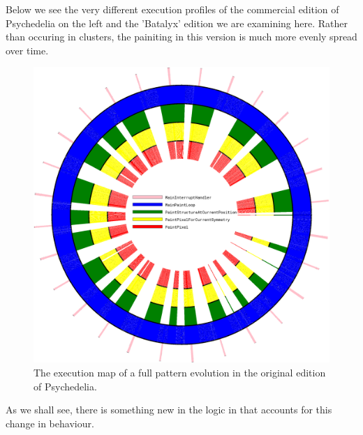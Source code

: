 \clearpage
Below we see the very different execution profiles of the commercial edition of Psychedelia on the left and 
the 'Batalyx' edition we are examining here. Rather than occuring in clusters, the painiting in this version
is much more evenly spread over time.
\vfill
\begin{figure}[H]                                                          
  \centering                                                             
  \begin{adjustbox}{width=13cm,center}                                   
  \includegraphics[width=13cm]{src/listing_commentary/execution_cycle.png}%
  \end{adjustbox}                                                        
\caption{The execution map of a full pattern evolution in the original edition of Psychedelia.}                                           
\end{figure}                                                               
\clearpage
As we shall see, there is something new in the logic in
 that accounts for this change in behaviour.
\vfill
